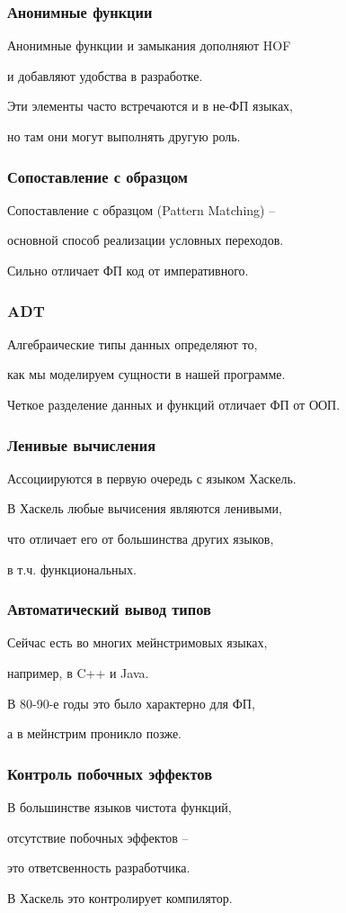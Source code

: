 \documentclass[10pt]{beamer}
\begin{document}
\begin{frame}
  \frametitle{Анонимные функции}
  Анонимные функции и замыкания дополняют HOF
  \par \bigskip
  и добавляют удобства в разработке.
  \par \bigskip
  Эти элементы часто встречаются и в не-ФП языках,
  \par \bigskip
  но там они могут выполнять другую роль.
\end{frame}

\begin{frame}
  \frametitle{Сопоставление с образцом}
  Сопоставление с образцом (Pattern Matching) --
  \par \bigskip
  основной способ реализации условных переходов.
  \par \bigskip
  Сильно отличает ФП код от императивного.
\end{frame}

\begin{frame}
  \frametitle{ADT}
  Алгебраические типы данных определяют то,
  \par \bigskip
  как мы моделируем сущности в нашей программе.
  \par \bigskip
  Четкое разделение данных и функций отличает ФП от ООП.
\end{frame}

\begin{frame}
  \frametitle{Ленивые вычисления}
  Ассоциируются в первую очередь с языком Хаскель.
  \par \bigskip
  В Хаскель любые вычисения являются ленивыми,
  \par \bigskip
  что отличает его от большинства других языков,
  \par \bigskip
  в т.ч. функциональных.
\end{frame}

\begin{frame}
  \frametitle{Автоматический вывод типов}
  Сейчас есть во многих мейнстримовых языках,
  \par \bigskip
  например, в C++ и Java.
  \par \bigskip
  В 80-90-е годы это было характерно для ФП,
  \par \bigskip
  а в мейнстрим проникло позже.
\end{frame}

\begin{frame}
  \frametitle{Контроль побочных эффектов}
  В большинстве языков чистота функций,
  \par \bigskip
  отсутствие побочных эффектов --
  \par \bigskip
  это ответсвенность разработчика.
  \par \bigskip
  В Хаскель это контролирует компилятор.
\end{frame}
\end{document}
